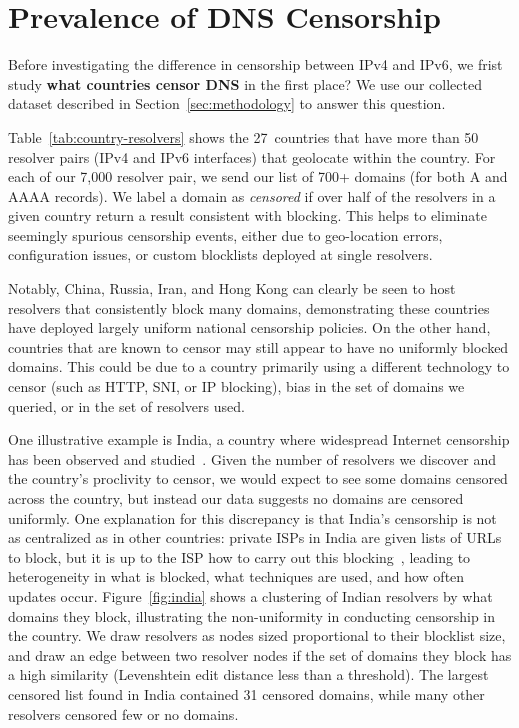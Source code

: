 \section{Prevalence of DNS Censorship}\label{sec:prevalence}


Before investigating the difference in censorship between IPv4 and IPv6, we
frist study \textbf{what countries censor DNS} in the first place?
We use our collected dataset described in Section~\ref{sec:methodology} to
answer this question.




\TabBaseRate


Table~\ref{tab:country-resolvers} shows the 27~countries that have more than 50
resolver pairs (IPv4 and IPv6 interfaces) that geolocate within the country.
For each of our 7,000 resolver pair, we send our list of 700+ domains (for both A
and AAAA records). We label a domain as \emph{censored} if over half of the
resolvers in a given country return a result consistent with blocking. This
helps to eliminate seemingly spurious censorship events, either due to geo-location
errors, configuration issues, or custom blocklists deployed at single resolvers.

Notably, China, Russia, Iran, and Hong Kong can clearly be seen to host
resolvers that consistently block many domains, demonstrating these countries have
deployed largely uniform national censorship policies. On the other hand,
countries that are known to censor may still appear to have no uniformly blocked
domains. This could be due to a country primarily using a different technology
to censor (such as HTTP, SNI, or IP blocking), bias in the set of domains we
queried, or in the set of resolvers used.

One illustrative example is India, a country where widespread Internet censorship has
been observed and studied~\cite{singh2020india,Yadav2018a}. Given the number
of resolvers we discover and the country's proclivity to censor, we would expect to see
some domains censored across the country, but instead our data suggests no
domains are censored uniformly. One explanation for this discrepancy is that
India's censorship is not as centralized as in other countries: private ISPs in
India are given lists of URLs to block, but it is up to the ISP how to carry out
this blocking~\cite{Gosain2017a}, leading to heterogeneity in what is blocked,
what techniques are used, and how often updates occur.  Figure~\ref{fig:india}
shows a clustering of Indian resolvers by what domains they block, illustrating the non-uniformity in
conducting censorship in the country. We draw resolvers as nodes sized proportional
to their blocklist size, and draw an edge between two resolver
nodes if the set of domains they block has a high similarity (Levenshtein edit
distance less than a threshold). The largest censored list found in India contained 31
censored domains, while many other resolvers censored few or no domains.


\FigIndiaCluster


